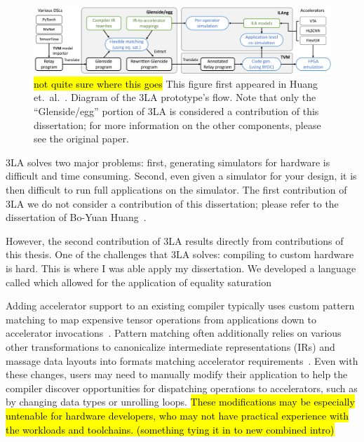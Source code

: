 \begin{figure}
    \centering
    \includegraphics[width=\textwidth]{assets/3la-diagram.pdf}
    \caption{
    \hl{not quite sure where this goes}
This figure first appeared
  in Huang et.~al.~\cite{huang2024application}.
Diagram of the 3LA prototype's flow.
Note that only the ``Glenside/egg''
  portion of 3LA
  is considered a contribution
  of this dissertation;
  for more information on the other components,
  please see the original paper.
}
    \label{fig:3la-diagram}
\end{figure}

3LA solves two major problems:
  first, generating simulators
  for hardware
  is difficult
  and time consuming.
Second, even given a simulator
  for your design,
  it is then difficult
  to run full applications
  on the simulator.
The first contribution
  of 3LA
  we do not consider
  a contribution of this dissertation;
  please refer to the dissertation
  of Bo-Yuan Huang~\cite{huang2022instruction}.

However,
  the second contribution of 3LA
  results directly from contributions
  of this thesis.
One of the challenges
  that 3LA solves:
  compiling to custom hardware is hard.
This is where I was able
  apply my dissertation.
We developed a language
  called \g
  which allowed for the application
  of equality saturation



Adding accelerator support to
  an existing compiler typically
  uses custom pattern matching to
  map expensive tensor operations
  from applications down to
  accelerator invocations~\cite{
    yang2020interstellar, byoc}.
Pattern matching often additionally relies on
  various other transformations
  to canonicalize intermediate representations (IRs)
  and massage data layouts into
  formats matching accelerator requirements~\cite{nvidia2020nhwc}.
Even with these changes,
  users may need to manually modify their application to
  help the compiler discover opportunities
  for dispatching operations to accelerators, 
  such as by changing data types or unrolling loops.
\hl{
These modifications may be especially
  untenable
  for hardware developers,
  who may not have practical experience
  with the workloads
  and toolchains. 
(something tying it in to new combined intro)
}
    
